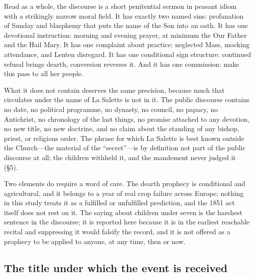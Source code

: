 Read as a whole, the discourse is a short penitential sermon in
peasant idiom with a strikingly narrow moral field. It has exactly
two named sins: profanation of Sunday and blasphemy that puts the
name of the Son into an oath. It has one devotional instruction:
morning and evening prayer, at minimum the Our Father and the Hail
Mary. It has one complaint about practice: neglected Mass, mocking
attendance, and Lenten disregard. It has one conditional sign
structure: continued refusal brings dearth, conversion reverses it.
And it has one commission: make this pass to all her people.

What it does not contain deserves the same precision, because much
that circulates under the name of La Salette is not in it. The
public discourse contains no date, no political programme, no
dynasty, no council, no papacy, no Antichrist, no chronology of the
last things, no promise attached to any devotion, no new title, no
new doctrine, and no claim about the standing of any bishop, priest,
or religious order. The phrase for which La Salette is best known
outside the Church---the material of the ``secret''---is by
definition not part of the public discourse at all; the children
withheld it, and the mandement never judged it (\S5).

Two elements do require a word of care. The dearth prophecy is
conditional and agricultural, and it belongs to a year of real crop
failure across Europe; nothing in this study treats it as a fulfilled
or unfulfilled prediction, and the 1851 act itself does not rest on
it. The saying about children under seven is the harshest sentence
in the discourse; it is reported here because it is in the earliest
reachable recital and suppressing it would falsify the record, and
it is not offered as a prophecy to be applied to anyone, at any
time, then or now.

\subsection{The title under which the event is received}


